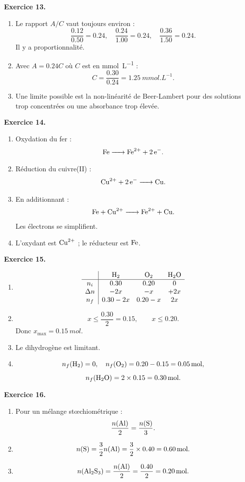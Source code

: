 \documentclass[11pt,a4paper]{article}
\newcommand{\corr}[2]{
  \begin{correctionbox}
  \textbf{Exercice #1.} #2
  \end{correctionbox}
}
\begin{document}
\corr{13}{
\begin{enumerate}
  \item Le rapport $A/C$ vaut toujours environ :
  \[
  \frac{0.12}{0.50}=0.24,\quad \frac{0.24}{1.00}=0.24,\quad \frac{0.36}{1.50}=0.24.
  \]
  Il y a proportionnalité.
  \item Avec $A=0.24C$ où $C$ est en \si{mmol.L^{-1}} :
  \[
  C=\frac{0.30}{0.24}=\SI{1.25}{mmol.L^{-1}}.
  \]
  \item Une limite possible est la non-linéarité de Beer-Lambert pour des solutions trop concentrées ou une absorbance trop élevée.
\end{enumerate}
}

\corr{14}{
\begin{enumerate}
  \item Oxydation du fer :
  \[
  \ce{Fe -> Fe^{2+} + 2e-}.
  \]
  \item Réduction du cuivre(II) :
  \[
  \ce{Cu^{2+} + 2e- -> Cu}.
  \]
  \item En additionnant :
  \[
  \ce{Fe + Cu^{2+} -> Fe^{2+} + Cu}.
  \]
  Les électrons se simplifient.
  \item L'oxydant est $\ce{Cu^{2+}}$ ; le réducteur est $\ce{Fe}$.
\end{enumerate}
}

\corr{15}{
\begin{enumerate}
  \item
  \[
  \begin{array}{c|ccc}
  & \ce{H2} & \ce{O2} & \ce{H2O}\\
  \hline
  n_i & 0.30 & 0.20 & 0\\
  \Delta n & -2x & -x & +2x\\
  n_f & 0.30-2x & 0.20-x & 2x
  \end{array}
  \]
  \item
  \[
  x\leq \frac{0.30}{2}=0.15,\qquad x\leq 0.20.
  \]
  Donc $x_{\max}=\SI{0.15}{mol}$.
  \item Le dihydrogène est limitant.
  \item
  \[
  n_f(\ce{H2})=0,\quad n_f(\ce{O2})=0.20-0.15=\SI{0.05}{mol},
  \]
  \[
  n_f(\ce{H2O})=2\times 0.15=\SI{0.30}{mol}.
  \]
\end{enumerate}
}

\corr{16}{
\begin{enumerate}
  \item Pour un mélange stœchiométrique :
  \[
  \frac{n(\ce{Al})}{2}=\frac{n(\ce{S})}{3}.
  \]
  \item
  \[
  n(\ce{S})=\frac{3}{2}n(\ce{Al})=\frac{3}{2}\times 0.40=\SI{0.60}{mol}.
  \]
  \item
  \[
  n(\ce{Al2S3})=\frac{n(\ce{Al})}{2}=\frac{0.40}{2}=\SI{0.20}{mol}.
  \]
\end{enumerate}
}
\end{document}
